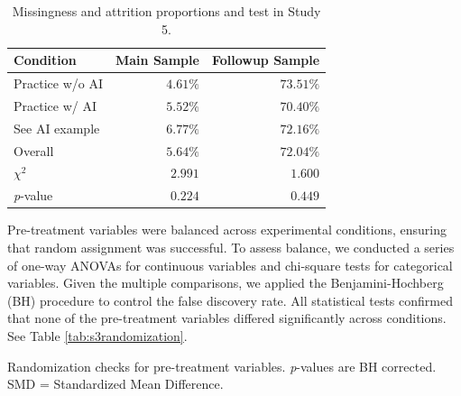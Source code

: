 \documentclass[11pt]{report}
\begin{document}
\begin{append}
\begin{table}[h]
    \centering
    \caption{Missingness and attrition proportions and test in Study 5.}
\begin{tabular}{lrr}
\toprule
Condition & Main Sample & Followup Sample \\ 
\midrule
Practice w/o AI & $4.61\%$ & $73.51\%$ \\ 
Practice w/ AI & $5.52\%$ & $70.40\%$ \\ 
See AI example & $6.77\%$ & $72.16\%$ \\ 
\midrule
Overall & $5.64\%$ & $72.04\%$ \\ 
\midrule
$\chi^2$ & $2.991$ & $1.600$ \\ 
\textit{p}-value & $0.224$ & $0.449$ \\ 
\bottomrule
\end{tabular}

    \label{tab:s3missingness}
\end{table}

Pre-treatment variables were balanced across experimental conditions, ensuring that random assignment was successful. To assess balance, we conducted a series of one-way ANOVAs for continuous variables and chi-square tests for categorical variables. Given the multiple comparisons, we applied the Benjamini-Hochberg (BH) procedure to control the false discovery rate. All statistical tests confirmed that none of the pre-treatment variables differed significantly across conditions. See Table \ref{tab:s3randomization}.



\begin{table}[h]
    \centering
    \footnotesize
\caption{Randomization checks for pre-treatment variables. \textit{p}-values are BH corrected. SMD = Standardized Mean Difference.}


\end{table}
\end{append}
\end{document}
